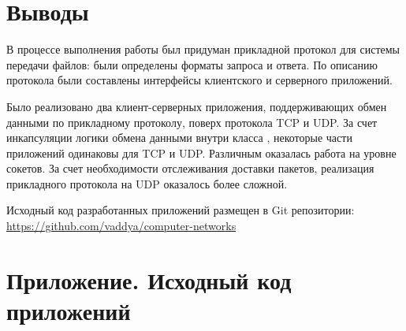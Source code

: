 \section{Выводы}


В процессе выполнения работы был придуман прикладной протокол для системы передачи файлов: были определены форматы запроса и ответа. По описанию протокола были составлены интерфейсы клиентского и серверного приложений.

Было реализовано два клиент-серверных приложения, поддерживающих обмен данными по прикладному протоколу, поверх протокола TCP и UDP. За счет инкапсуляции логики обмена данными внутри класса , некоторые части приложений одинаковы для TCP и UDP. Различным оказалась работа на уровне сокетов. За счет необходимости отслеживания доставки пакетов, реализация прикладного протокола на UDP оказалось более сложной.

Исходный код разработанных приложений размещен в Git репозитории: 
\url{https://github.com/vaddya/computer-networks}

\newpage

\section*{Приложение. Исходный код приложений}


















